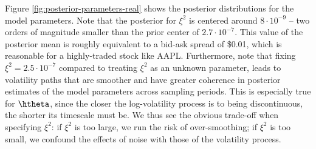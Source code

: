 Figure \ref{fig:posterior-parameters-real} shows the posterior distributions for the model parameters.   Note that the posterior for $\xi^2$ is centered around $8 \cdot 10^{-9}$ -- two orders of magnitude smaller than the prior center of $2.7 \cdot 10^{-7}$. This value of the posterior mean is roughly equivalent to a bid-ask spread of \$0.01, which is reasonable for a highly-traded stock like AAPL.  Furthermore, note that fixing $\xi^2 = 2.5\cdot 10^{-7}$ compared to treating $\xi^2$ as an unknown parameter, leads to volatility paths that are smoother and have greater coherence in posterior estimates of the model parameters across sampling periods.  This is especially true for $\htheta$, since the closer the log-volatility process is to being discontinuous, the shorter its timescale must be.  We thus see the obvious trade-off when specifying $\xi^2$: if $\xi^2$ is too large, we run the risk of over-smoothing; if $\xi^2$ is too small, we confound the effects of noise with those of the volatility process.

